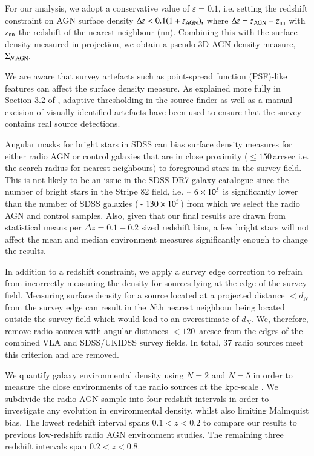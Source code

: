 For our analysis, we adopt a conservative value of $\varepsilon =  0.1$, i.e. setting the redshift constraint on AGN surface density $\Delta z  < 0.1(1+z_{\rm{AGN}}),$ where $\Delta z = z_{\rm{AGN}} - z_{\rm{nn}}$ with z$_{\rm{nn}}$ the redshift of the nearest neighbour (nn). Combining this with the surface density measured in projection, we obtain a pseudo-3D AGN density measure, $\Sigma_{N,\rm{AGN}}.$

We are aware that survey artefacts such as point-spread function (PSF)-like features can affect the surface density measure. As explained more fully in Section 3.2 of \citet{heywood2016}, adaptive thresholding in the source finder as well as a manual excision of visually identified artefacts have been used to ensure that the survey contains real source detections. 

Angular masks for bright stars in SDSS can bias surface density measures for either radio AGN or control galaxies that are in close proximity ($\leq150$\,arcsec i.e. the search radius for nearest neighbours) to foreground stars in the survey field. This is not likely to be an issue in the SDSS DR7 galaxy catalogue since the number of bright stars in the Stripe 82 field, i.e. $\sim6\times 10^{5}$ \citep{blanton2005} is significantly lower than the number of SDSS galaxies ($\sim130\times 10^{5}$) from which we select the radio AGN and control samples. Also, given that our final results are drawn from statistical means per $\Delta z = 0.1-0.2$ sized redshift bins, a few bright stars will not affect the mean and median environment measures significantly enough to change the results.

In addition to a redshift constraint, we apply a survey edge correction to refrain from incorrectly measuring the density for sources lying at the edge of the survey field. Measuring surface density for a source located at a projected distance $<d_N$ from the survey edge can result in the $N$th nearest neighbour being located outside the survey field which would lead to an overestimate of $d_N$.  We, therefore, remove radio sources with angular distances $<120$ \,arcsec from the edges of the combined VLA and SDSS/UKIDSS survey fields. In total, 37 radio sources meet this criterion and are removed.

We quantify galaxy environmental density using $N=2$ and $N=5$ in order to measure the close environments of the radio sources at the kpc-scale \citep{karouzos2014a,karouzos2014c}. We subdivide the radio AGN sample into four redshift intervals in order to investigate any evolution in environmental density, whilst also limiting Malmquist bias. The lowest redshift interval spans $0.1 < z < 0.2$ to compare our results to previous low-redshift radio AGN environment studies. The remaining three redshift intervals span $0.2 < z < 0.8.$ 

